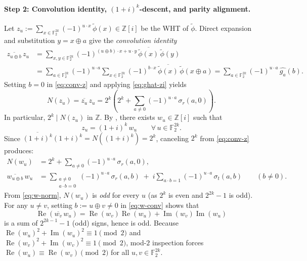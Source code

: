 \documentclass[11pt,a4paper]{article}
\theoremstyle{plain}
\theoremstyle{definition}
\theoremstyle{remark}
\newcommand{\Z}{\mathbb{Z}}
\newcommand{\F}{\mathbb{F}}
\newcommand{\Zi}{\mathbb{Z}[i]}
\newcommand{\RePart}{\operatorname{Re}}
\newcommand{\ImPart}{\operatorname{Im}}
\numberwithin{equation}{section}
\begin{document}
\paragraph{Step 2: Convolution identity, $(1+i)^k$-descent, and parity alignment.}
Let $z_u := \sum_{x \in \F_2^{2k}} (-1)^{u \cdot x}\,\tilde{\phi}(x) \in \Zi$ be the WHT of $\tilde{\phi}$. Direct expansion and substitution $y = x \oplus a$ give the \emph{convolution identity}
\begin{align}
  \overline{z_{u \oplus b}}\, z_u
  &= \sum_{x, y \in \F_2^{2k}} (-1)^{(u \oplus b)\cdot x + u \cdot y}\,\overline{\tilde{\phi}(x)}\,\tilde{\phi}(y) \nonumber\\
  &= \sum_{a \in \F_2^{2k}} (-1)^{u \cdot a} \sum_{x \in \F_2^{2k}} (-1)^{b \cdot x}\,\overline{\tilde{\phi}(x)}\,\tilde{\phi}(x \oplus a)
  = \sum_{a \in \F_2^{2k}} (-1)^{u \cdot a}\,\widehat{g_a}(b). \label{eq:conv-z}
\end{align}
Setting $b = 0$ in \eqref{eq:conv-z} and applying \eqref{eq:ghat-zi} yields
\[
  N(z_u) = \overline{z_u}\,z_u = 2^k\!\left(2^k + \sum_{a \neq 0} (-1)^{u \cdot a}\,\sigma_r(a, 0)\right).
\]
In particular, $2^k \mid N(z_u)$ in $\Z$. By , there exists $w_u \in \Zi$ such that
\begin{equation}\label{eq:z-factor}
  z_u = (1+i)^k\, w_u \qquad \forall\, u \in \F_2^{2k}.
\end{equation}
Since $\overline{(1+i)^k}(1+i)^k = N((1+i)^k) = 2^k$, canceling $2^k$ from \eqref{eq:conv-z} produces:
\begin{align}
  N(w_u) &= 2^k + \sum_{a \neq 0} (-1)^{u \cdot a}\,\sigma_r(a, 0), \label{eq:w-norm} \\
  \overline{w_{u \oplus b}}\, w_u &= \sum_{\substack{a \neq 0 \\ a \cdot b = 0}} (-1)^{u \cdot a}\,\sigma_r(a, b)
    \;+\; i \sum_{a \cdot b = 1} (-1)^{u \cdot a}\,\sigma_t(a, b) \qquad (b \neq 0). \label{eq:w-conv}
\end{align}
From \eqref{eq:w-norm}, $N(w_u)$ is \emph{odd} for every $u$ (as $2^k$ is even and $2^{2k} - 1$ is odd). For any $u \neq v$, setting $b := u \oplus v \neq 0$ in \eqref{eq:w-conv} shows that
\[
  \RePart(\overline{w_v}\,w_u) = \RePart(w_v)\RePart(w_u) + \ImPart(w_v)\ImPart(w_u)
\]
is a sum of $2^{2k-1} - 1$ (odd) signs, hence is odd. Because $\RePart(w_u)^2 + \ImPart(w_u)^2 \equiv 1 \pmod{2}$ and $\RePart(w_v)^2 + \ImPart(w_v)^2 \equiv 1 \pmod{2}$, mod-$2$ inspection forces $\RePart(w_u) \equiv \RePart(w_v) \pmod{2}$ for all $u, v \in \F_2^{2k}$.
\end{document}
